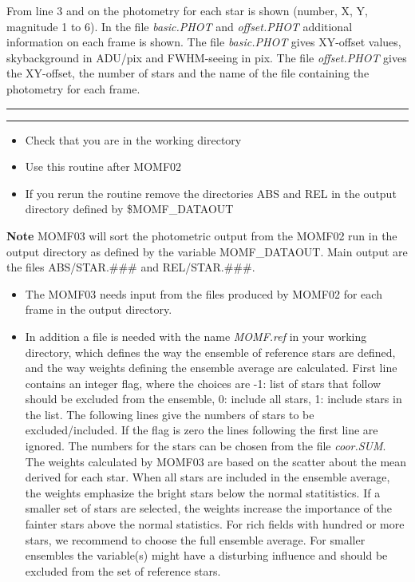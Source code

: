 \documentclass[]{article}
\begin{document}
From line 3 and on the
photometry for each star is shown (number, X, Y, magnitude 1 to 6).
In the file {\sl basic.PHOT} and {\sl offset.PHOT} additional 
information on each
frame is shown. The file {\sl basic.PHOT} gives XY-offset values,
skybackground in ADU/pix and FWHM-seeing in pix. The file {\sl offset.PHOT}
gives the XY-offset, the number of stars and the name of the file
containing the photometry for each frame. 
\newpage
{}
\newline \rule{15.5cm}{0.3mm}
\vspace{0.1mm}
\newline \rule{15.5cm}{0.3mm}
\vspace{4mm}
\begin{itemize}
\item Check that you are in the working directory
\item Use this routine after MOMF02
\item If you rerun the routine remove the directories ABS and REL
in the output directory defined by \$MOMF\_DATAOUT
\end{itemize}
\vspace{2mm}
{\bf Note}
\newline MOMF03 will sort the photometric output from the
MOMF02 run in the output directory as defined  by the variable
MOMF\_DATAOUT. Main output are 
the files ABS/STAR.\#\#\# and
REL/STAR.\#\#\#. 
\vspace{4mm}
\begin{itemize}
\item The MOMF03 needs input from the files produced by MOMF02 for 
each frame in the output directory.
\item In addition a file is needed with the name {\it MOMF.ref} in your
working directory, which defines the way the ensemble of reference
stars are defined, and the way weights defining the ensemble average
are calculated. First line contains an integer flag, where the choices
are -1: list of stars that follow should be excluded from the ensemble,
0: include all stars, 1: include stars in the list. The following lines
give the numbers of stars to be excluded/included. If the flag is
zero the lines following the first line are ignored. The numbers 
for the stars can
be chosen from the file {\it coor.SUM}.
The weights calculated by MOMF03 are based on the scatter about the
mean derived for each star. When all stars are included in the ensemble
average, the weights emphasize the bright stars below the normal
statitistics. If a smaller set
of stars are selected, the weights increase the importance of the
fainter stars above the normal statistics.
For rich fields with hundred or more stars, we recommend to
choose
the full ensemble average. For smaller ensembles the variable(s)
might have a disturbing influence and should be excluded from the
set of reference stars.
\end{itemize}
\end{document}
